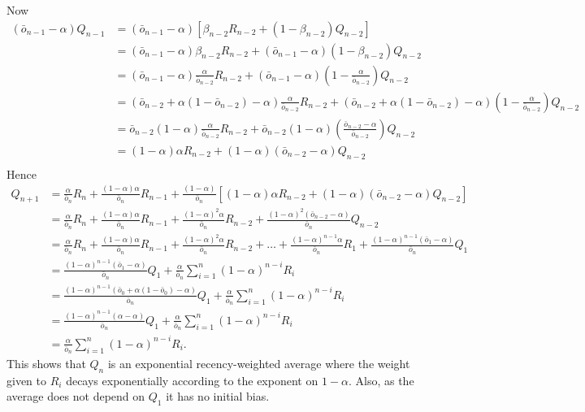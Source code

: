 \documentclass[a4paper,11pt]{article}
\numberwithin{equation}{section}
\theoremstyle{remark}
\begin{document}
Now 
\begin{align*}
	(\bar{o}_{n-1} - \alpha) Q_{n-1} & = (\bar{o}_{n-1} - \alpha) [\beta_{n-2} R_{n-2} + (1-\beta_{n-2}) Q_{n-2}] \\
	& = (\bar{o}_{n-1} - \alpha)\beta_{n-2} R_{n-2} + (\bar{o}_{n-1} - \alpha) (1-\beta_{n-2}) Q_{n-2}	\\
	& = (\bar{o}_{n-1} - \alpha)\frac{\alpha}{\bar{o}_{n-2}} R_{n-2} + (\bar{o}_{n-1} - \alpha)	\left(1-\frac{\alpha}{\bar{o}_{n-2}}\right) Q_{n-2} \\
	& = (\bar{o}_{n-2} + \alpha(1 - \bar{o}_{n-2}) - \alpha)\frac{\alpha}{\bar{o}_{n-2}} R_{n-2} + (\bar{o}_{n-2} + \alpha(1 - \bar{o}_{n-2}) - \alpha)	\left(1-\frac{\alpha}{\bar{o}_{n-2}}\right) Q_{n-2} \\
	& = \bar{o}_{n-2}(1 - \alpha)\frac{\alpha}{\bar{o}_{n-2}} R_{n-2} + \bar{o}_{n-2}(1 - \alpha) \left(\frac{\bar{o}_{n-2} - \alpha}{\bar{o}_{n-2}}\right) Q_{n-2} \\
	& = (1 - \alpha)\alpha R_{n-2} + (1 - \alpha)(\bar{o}_{n-2} - \alpha)  Q_{n-2} \\
\end{align*}
Hence
\begin{align*}
	Q_{n+1} & = \frac{\alpha}{\bar{o}_n} R_n + \frac{(1-\alpha)\alpha}{\bar{o}_n} R_{n-1} + \frac{(1-\alpha)}{\bar{o}_n}[(1 - \alpha)\alpha R_{n-2} + (1 - \alpha)(\bar{o}_{n-2} - \alpha)  Q_{n-2}] \\
	& =  \frac{\alpha}{\bar{o}_n} R_n + \frac{(1-\alpha)\alpha}{\bar{o}_n} R_{n-1} + \frac{(1-\alpha)^2\alpha}{\bar{o}_n} R_{n-2} + \frac{(1-\alpha)^2(\bar{o}_{n-2} - \alpha)}{\bar{o}_n}	Q_{n-2} \\
	& = \frac{\alpha}{\bar{o}_n} R_n + \frac{(1-\alpha)\alpha}{\bar{o}_n} R_{n-1} + \frac{(1-\alpha)^2\alpha}{\bar{o}_n} R_{n-2} + \dots + \frac{(1-\alpha)^{n-1}\alpha}{\bar{o}_n} R_1 + \frac{(1-\alpha)^{n-1}(\bar{o}_1 - \alpha)}{\bar{o}_n}Q_1 \\
	& = \frac{(1-\alpha)^{n-1}(\bar{o}_1 - \alpha)}{\bar{o}_n}Q_1 + \frac{\alpha}{\bar{o}_n} \sum_{i=1}^{n} (1-\alpha)^{n-i} R_i \\
	& = \frac{(1-\alpha)^{n-1}(\bar{o}_0 + \alpha(1 - \bar{o}_0) - \alpha)}{\bar{o}_n}Q_1 + \frac{\alpha}{\bar{o}_n} \sum_{i=1}^{n} (1-\alpha)^{n-i} R_i \\
	& = \frac{(1-\alpha)^{n-1}(\alpha - \alpha)}{\bar{o}_n}Q_1 + \frac{\alpha}{\bar{o}_n} \sum_{i=1}^{n} (1-\alpha)^{n-i} R_i \\
	& = \frac{\alpha}{\bar{o}_n} \sum_{i=1}^{n} (1-\alpha)^{n-i} R_i.
\end{align*}
This shows that $Q_n$ is an exponential recency-weighted average where the weight given to $R_i$ decays exponentially according to the exponent on $1-\alpha$. Also, as the average does not depend on $Q_1$ it has no initial bias.
\end{document}
